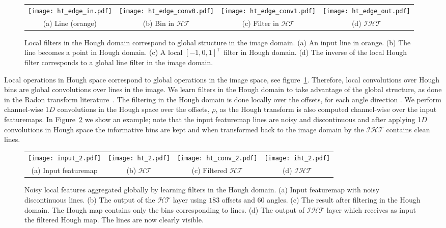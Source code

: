 \documentclass[runningheads]{llncs}
\begin{document}
\begin{figure}[t]
    \centering
    \begin{tabular}{cccc}
        \texttt{[image: ht\_edge\_in.pdf]} &
        \texttt{[image: ht\_edge\_conv0.pdf]} &
        \texttt{[image: ht\_edge\_conv1.pdf]} & 
        \texttt{[image: ht\_edge\_out.pdf]} \\
        \footnotesize{(a) Line (orange)} & \footnotesize{(b) Bin in $\mathcal{HT}$ } & \footnotesize{(c) Filter in $\mathcal{HT}$ } & \footnotesize{(d) $\mathcal{IHT}$  } \\
    \end{tabular}
    \caption{Local filters in the Hough domain correspond to global structure in the image domain. (a) An input line in orange. (b) The line becomes a point in Hough domain. (c) A local $[-1, 0, 1]^\intercal$ filter in Hough domain. (d) The inverse of the local Hough filter corresponds to a global line filter in the image domain. }
    \label{fig:edge_in_HT}
\end{figure}

Local operations in Hough space correspond to global operations in the image space, see figure~\ref{fig:edge_in_HT}. Therefore, local convolutions over Hough bins are global convolutions over lines in the image.
We learn filters in the Hough domain to take advantage of the global structure, as done in the Radon transform literature~\cite{magnusson1993linogram}. The filtering in the Hough domain is done locally over the offsets, for each angle direction \cite{nikolaev2008hough,wei2019x}.
We perform channel-wise 1$D$ convolutions in the Hough space over the offsets, $\rho$, as the Hough transform is also computed channel-wise over the input featuremaps.  In Figure~\ref{fig:conv} we show an example; note that the input featuremap lines are noisy and discontinuous and after applying 1$D$ convolutions in Hough space the informative bins are kept and when transformed back to the image domain by the $\mathcal{IHT}$ contains clean lines.  
\begin{figure}[t!]
    \centering
    \begin{tabular}{c@{\hskip 0.25 in}c@{\hskip 0.10 in}c@{\hskip 0.10 in}c}
    \texttt{[image: input\_2.pdf]} &
    \texttt{[image: ht\_2.pdf]} &
    \texttt{[image: ht\_conv\_2.pdf]} &
    \texttt{[image: iht\_2.pdf]} \\
    (a) Input featuremap & (b) $\mathcal{HT}$ & (c) Filtered $\mathcal{HT}$ & (d) $\mathcal{IHT}$\\
    \end{tabular}
    \caption{ Noisy local features aggregated globally by learning filters in the Hough domain. 
    (a) Input featuremap with noisy discontinuous lines. 
    (b) The output of the $\mathcal{HT}$ layer using $183$ offsets and $60$ angles. 
    (c) The result after filtering in the Hough domain. The Hough map contains only the bins corresponding to lines.
    (d) The output of $\mathcal{IHT}$ layer which receives as input the filtered Hough map. The lines are now clearly visible.}
    \label{fig:conv}
\end{figure}
\end{document}
